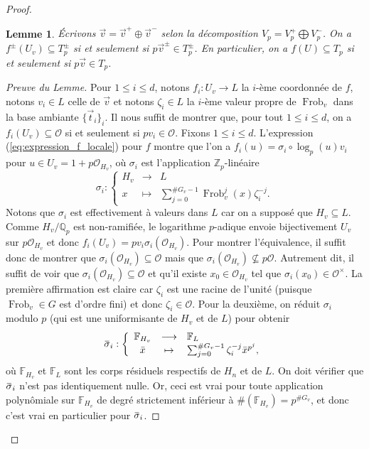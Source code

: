 \documentclass[12pt]{amsart}
\newcommand\bF{\mathbb{F}}
\newcommand\Zp{{\mathbb{Z}_{p}}}
\newcommand\Qp{\mathbb{Q}_{p}}
\newcommand\cO{\mathcal{O}}
\newcommand{\ob}[1]{\mkern 1.5mu\overline{\mkern-1.5mu#1\mkern-1.5mu}\mkern 1.5mu}
\DeclareMathOperator{\Frob}{Frob}
\theoremstyle{defstyle}
\theoremstyle{thmstyle}
\newtheorem{lemme}[subsubsection]{Lemme}
\begin{document}
\begin{proof}
	\begin{lemme}
		\'Ecrivons $\vec{v}=\vec{v}^+ \oplus \vec{v}^-$ selon la décomposition $V_p=V_p^+\bigoplus V_p^-$. On a $f^\pm(U_v) \subseteq T_p^\pm$ si et seulement si $p \vec{v}^\pm \in T_p^\pm$. En particulier, on a $f(U)\subseteq T_p$ si et seulement si $p\vec{v}\in T_p$.
	\end{lemme}
	\begin{proof}[Preuve du Lemme]
		 Pour $1\leq i \leq d$, notons $f_i:U_v \longrightarrow L$ la $i$-ème coordonnée de $f$, notons $v_i \in L$ celle de $\vec{v}$ et notons $\zeta_i\in L$ la $i$-ème valeur propre de $\Frob_v$ dans la base ambiante $\{\vec{t}_i\}_i$. Il nous suffit de montrer que, pour tout $1\leq i \leq d$, on a $f_i(U_v)\subseteq \cO$ si et seulement si $pv_i\in \cO$. Fixons $1\leq i \leq d$. L'expression (\ref{eq:expression_f_locale}) pour $f$ montre que l'on a $f_i(u)=\sigma_i\circ \log_p(u) v_i$ pour $u\in U_v=1+p\cO_{H_v}$, où $\sigma_i$ est l'application $\Zp$-linéaire $$\sigma_i :  \left\{\begin{array}{ccl} H_v & \longrightarrow & L \\
		  x&\mapsto & \sum_{j=0}^{\#G_v-1}\Frob^{j}_v(x)\zeta_i^{-j}. 
		  \end{array}\right.$$ 
		 Notons que $\sigma_i$ est effectivement à valeurs dans $L$ car on a supposé que $H_v\subseteq L$. Comme $H_v/\Qp$ est non-ramifiée, le logarithme $p$-adique envoie bijectivement $U_v$ sur $p\cO_{H_v}$ et donc $f_i(U_v)=pv_i\sigma_i\left(\cO_{H_v}\right)$. Pour montrer l'équivalence, il suffit donc de montrer que $\sigma_i\left(\cO_{H_v}\right)\subseteq \cO$ mais que $\sigma_i\left(\cO_{H_v}\right) \not\subseteq p\cO$. Autrement dit, il suffit de voir que $\sigma_i\left(\cO_{H_v}\right)\subseteq \cO$ et qu'il existe $x_0\in\cO_{H_v}$ tel que $\sigma_i(x_0)\in\cO^\times$. La première affirmation est claire car $\zeta_i$ est une racine de l'unité (puisque $\Frob_v\in G$ est d'ordre fini) et donc $\zeta_i\in \cO$. Pour la deuxième, on réduit $\sigma_i$ modulo $p$ (qui est une uniformisante de $H_v$ et de $L$) pour obtenir 
		 $$\ob{\sigma}_i :  \left\{\begin{array}{ccl} \bF_{H_v} & \longrightarrow & \bF_{L} \\
		 \bar{x}&\mapsto & \sum_{j=0}^{\#G_v-1}\zeta_i^{-j}\bar{x}^{p^j}, 
		 \end{array}\right.$$ 
		 où $\bF_{H_v}$ et $\bF_{L}$ sont les corps résiduels respectifs de $H_n$ et de $L$. On doit vérifier que $\ob{\sigma}_i$ n'est pas identiquement nulle. Or, ceci est vrai pour toute application polynômiale sur $\bF_{H_v}$ de degré strictement inférieur à $\#\left(\bF_{H_v}\right)=p^{\#G_v}$, et donc c'est vrai en particulier pour $\ob{\sigma}_i$.

\end{proof}
\end{proof}
\end{document}
